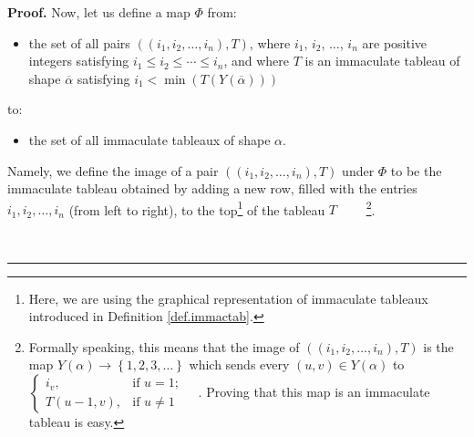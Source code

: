 \documentclass
[numbers=enddot,12pt,final,onecolumn,notitlepage,abstracton]{scrartcl}%
\theoremstyle{definition}
\newenvironment{proof}[1][Proof]{\noindent\textbf{#1.} }{\ \rule{0.5em}{0.5em}}
\begin{document}
\begin{proof}
Now, let us define a map $\Phi$ from:

\begin{itemize}
\item the set of all pairs $\left(  \left(  i_{1},i_{2},\ldots,i_{n}\right)
,T\right)  $, where $i_{1}$, $i_{2}$, $\ldots$, $i_{n}$ are positive integers
satisfying $i_{1}\leq i_{2}\leq\cdots\leq i_{n}$, and where $T$ is an
immaculate tableau of shape $\overline{\alpha}$ satisfying $i_{1}<\min\left(
T\left(  Y\left(  \overline{\alpha}\right)  \right)  \right)  $
\end{itemize}

to:

\begin{itemize}
\item the set of all immaculate tableaux of shape $\alpha$.
\end{itemize}

Namely, we define the image of a pair $\left(  \left(  i_{1},i_{2}%
,\ldots,i_{n}\right)  ,T\right)  $ under $\Phi$ to be the immaculate tableau
obtained by adding a new row, filled with the entries $i_{1},i_{2}%
,\ldots,i_{n}$ (from left to right), to the top\footnote{Here, we are using
the graphical representation of immaculate tableaux introduced in Definition
\ref{def.immactab}.} of the tableau $T$ \ \ \ \ \footnote{Formally speaking,
this means that the image of $\left(  \left(  i_{1},i_{2},\ldots,i_{n}\right)
,T\right)  $ is the map $Y\left(  \alpha\right)  \rightarrow\left\{
1,2,3,\ldots\right\}  $ which sends every $\left(  u,v\right)  \in Y\left(
\alpha\right)  $ to $%
\begin{cases}
i_{v}, & \text{if }u=1;\\
T\left(  u-1,v\right)  , & \text{if }u\neq1
\end{cases}
\quad$. Proving that this map is an immaculate tableau is easy.}.


\end{proof}
\end{document}
